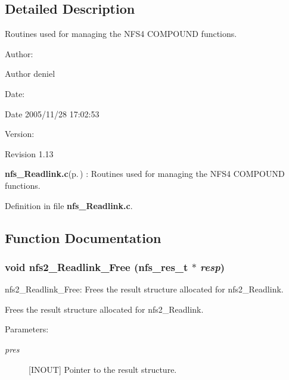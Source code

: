 \subsection{Detailed Description}
Routines used for managing the NFS4 COMPOUND functions. 

\begin{Desc}
\item[Author:]\begin{Desc}
\item[Author]deniel \end{Desc}
\end{Desc}
\begin{Desc}
\item[Date:]\begin{Desc}
\item[Date]2005/11/28 17:02:53 \end{Desc}
\end{Desc}
\begin{Desc}
\item[Version:]\begin{Desc}
\item[Revision]1.13 \end{Desc}
\end{Desc}
{\bf nfs\_\-Readlink.c}{\rm (p.\,\pageref{nfs__Readlink_8c})} : Routines used for managing the NFS4 COMPOUND functions.

Definition in file {\bf nfs\_\-Readlink.c}.

\subsection{Function Documentation}
\subsubsection{\setlength{\rightskip}{0pt plus 5cm}void nfs2\_\-Readlink\_\-Free (nfs\_\-res\_\-t $\ast$ {\em resp})}\label{nfs__Readlink_8c_a1}


nfs2\_\-Readlink\_\-Free: Frees the result structure allocated for nfs2\_\-Readlink.

Frees the result structure allocated for nfs2\_\-Readlink.

\begin{Desc}
\item[Parameters:]
\begin{description}
\item[{\em pres}][INOUT] Pointer to the result structure. \end{description}
\end{Desc}


